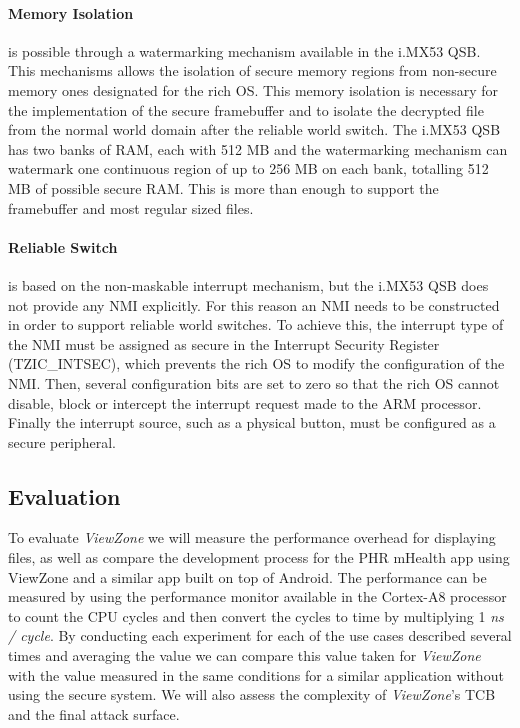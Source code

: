 \paragraph{Memory Isolation} is possible through a watermarking mechanism available in the i.MX53 QSB. This mechanisms allows the isolation of secure memory regions from non-secure memory ones designated for the rich OS. This memory isolation is necessary for the implementation of the secure framebuffer and to isolate the decrypted file from the normal world domain after the reliable world switch. The i.MX53 QSB has two banks of RAM, each with 512 MB and the watermarking mechanism can watermark one continuous region of up to 256 MB on each bank, totalling 512 MB of possible secure RAM. This is more than enough to support the framebuffer and most regular sized files.

\paragraph{Reliable Switch} is based on the non-maskable interrupt mechanism, but the i.MX53 QSB does not provide any \ac{NMI} explicitly. For this reason an \ac{NMI} needs to be constructed in order to support reliable world switches. To achieve this, the interrupt type of the \ac{NMI} must be assigned as secure in the Interrupt Security Register (TZIC\_INTSEC), which prevents the rich OS to modify the configuration of the \ac{NMI}. Then, several configuration bits are set to zero so that the rich OS cannot disable, block or intercept the interrupt request made to the ARM processor. Finally the interrupt source, such as a physical button, must be configured as a secure peripheral.

\subsection{Evaluation}

To evaluate \emph{ViewZone} we will measure the performance overhead for displaying files, as well as compare the development process for the PHR mHealth app using ViewZone and a similar app built on top of Android. The performance can be measured by using the performance monitor available in the Cortex-A8 processor to count the CPU cycles and then convert the cycles to time by multiplying 1 \emph{ns / cycle}. By conducting each experiment for each of the use cases described several times and averaging the value we can compare this value taken for \emph{ViewZone} with the value measured in the same conditions for a similar application without using the secure system. We will also assess the complexity of \emph{ViewZone}'s TCB and the final attack surface.


